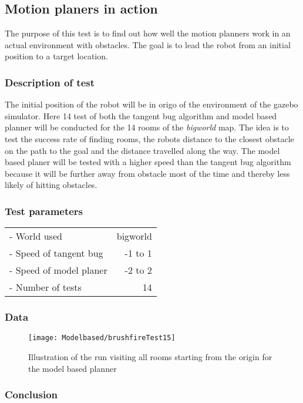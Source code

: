 \documentclass[../Head/Main.tex]{subfiles}
\begin{document}
\subsection{Motion planers in action}

The purpose of this test is to find out how well the motion planners work in an actual environment with obstacles. The goal is to lead the robot from an initial position to a target location. 

\subsubsection{Description of test}

The initial position of the robot will be in origo of the environment of the gazebo simulator. Here 14 test of both the tangent bug algorithm and model based planner will be conducted for the 14 rooms of the \textit{bigworld} map. The idea is to test the success rate of finding rooms, the robots distance to the closest obstacle on the path to the goal and the distance travelled along the way. The model based planer will be tested with a higher speed than the tangent bug algorithm because it will be further away from obstacle most of the time and thereby less likely of hitting obstacles.           

\subsubsection{Test parameters}

\begin{tabular}{l r}
	- World used                & bigworld\\	
	- Speed of tangent bug      & -1 to 1\\
	- Speed of model planer     & -2 to 2\\
	- Number of tests           & 14
\end{tabular}

\subsubsection{Data}





\begin{figure}[H]
	\centering
	\texttt{[image: Modelbased/brushfireTest15]}
	\caption{Illustration of the run visiting all rooms starting from the origin for the model based planner}
	\label{fig:Test15}
\end{figure}

\subsubsection{Conclusion}
\end{document}

